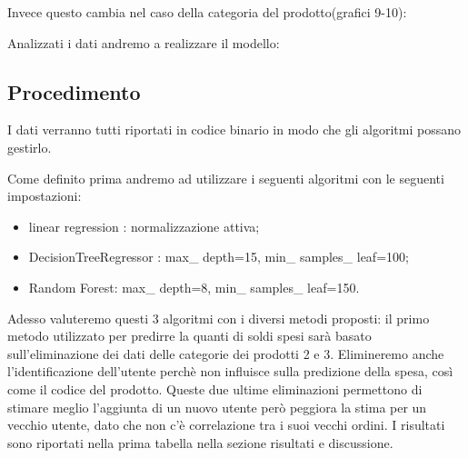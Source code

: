 \documentclass{article}
\begin{document}
Invece questo cambia nel caso della categoria del prodotto(grafici 9-10):
\begin{figure}[htp!]
\centering
{}
\end{figure}

Analizzati i dati andremo a realizzare il modello:
 

\subsection{Procedimento}

I dati verranno tutti riportati in codice binario in modo che gli algoritmi possano gestirlo.

Come definito prima andremo ad utilizzare i seguenti algoritmi con le seguenti impostazioni:
\begin{itemize}
\item linear regression : normalizzazione attiva;
\item DecisionTreeRegressor : max\_ depth=15, min\_ samples\_ leaf=100;
\item Random Forest: max\_ depth=8, min\_ samples\_ leaf=150.
\end{itemize}

Adesso valuteremo questi 3 algoritmi con i diversi metodi proposti:
il primo metodo utilizzato per predirre la quanti di soldi spesi sarà basato sull'eliminazione dei dati delle categorie dei prodotti 2 e 3. Elimineremo anche l'identificazione dell'utente perchè non influisce sulla predizione della spesa, così come il codice del prodotto. Queste due ultime eliminazioni permettono di stimare meglio l'aggiunta di un nuovo utente però peggiora la stima per un vecchio utente, dato che non c'è correlazione tra i suoi vecchi ordini. I risultati sono riportati nella prima tabella nella sezione risultati e discussione.
\end{document}
